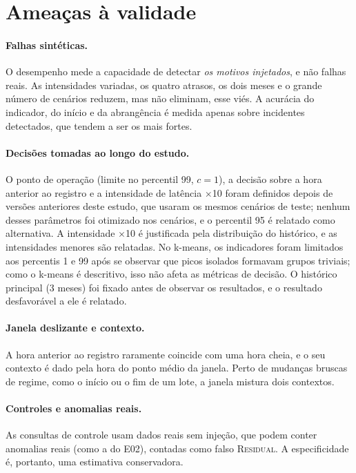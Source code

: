 \documentclass[sigconf,nonacm]{acmart}
\newcommand{\Residual}{\textsc{Residual}\xspace}
\begin{document}
\section{Ameaças à validade}\label{sec:ameacas}

\paragraph{Falhas sintéticas.} O desempenho mede a capacidade de detectar \emph{os motivos injetados}, e não falhas reais. As intensidades variadas, os quatro atrasos, os dois meses e o grande número de cenários reduzem, mas não eliminam, esse viés. A acurácia do indicador, do início e da abrangência é medida apenas sobre incidentes detectados, que tendem a ser os mais fortes.

\paragraph{Decisões tomadas ao longo do estudo.} O ponto de operação (limite no percentil 99, $c=1$), a decisão sobre a hora anterior ao registro e a intensidade de latência $\times$10 foram definidos depois de versões anteriores deste estudo, que usaram os mesmos cenários de teste; nenhum desses parâmetros foi otimizado nos cenários, e o percentil 95 é relatado como alternativa. A intensidade $\times$10 é justificada pela distribuição do histórico, e as intensidades menores são relatadas. No k-means, os indicadores foram limitados aos percentis 1 e 99 após se observar que picos isolados formavam grupos triviais; como o k-means é descritivo, isso não afeta as métricas de decisão. O histórico principal (3 meses) foi fixado antes de observar os resultados, e o resultado desfavorável a ele é relatado.

\paragraph{Janela deslizante e contexto.} A hora anterior ao registro raramente coincide com uma hora cheia, e o seu contexto é dado pela hora do ponto médio da janela. Perto de mudanças bruscas de regime, como o início ou o fim de um lote, a janela mistura dois contextos.

\paragraph{Controles e anomalias reais.} As consultas de controle usam dados reais sem injeção, que podem conter anomalias reais (como a do E02), contadas como falso \Residual. A especificidade é, portanto, uma estimativa conservadora.
\end{document}
